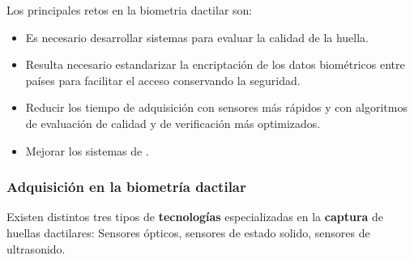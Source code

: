 Los principales retos en la \gls{biometria} \gls{dactilar} son:

\begin{itemize}
    \item 
    Es necesario desarrollar sistemas para evaluar la calidad de la huella.
    
    \item
    Resulta necesario estandarizar la encriptación de los datos biométricos entre países para facilitar el acceso conservando la seguridad. 
    
    \item
    Reducir los tiempo de adquisición con sensores más rápidos y con algoritmos de evaluación de calidad y de verificación más optimizados.
    
    \item
    Mejorar los sistemas de  \cite{marasco2015survey}.
\end{itemize}

\color{black}


\subsubsection{Adquisición en la biometría dactilar}\label{sec:AdquisicionDactilarABC}

Existen distintos tres tipos de \textbf{tecnologías} especializadas en la \textbf{captura} de huellas dactilares: Sensores ópticos, sensores de estado solido, sensores de ultrasonido. 


